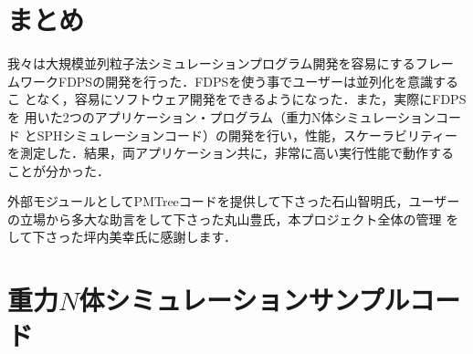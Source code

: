 \documentclass[submit,techreq,noauthor]{ipsj}
\begin{document}
\section{まとめ}

我々は大規模並列粒子法シミュレーションプログラム開発を容易にするフレー
ムワークFDPSの開発を行った．FDPSを使う事でユーザーは並列化を意識するこ
となく，容易にソフトウェア開発をできるようになった．また，実際にFDPSを
用いた2つのアプリケーション・プログラム（重力N体シミュレーションコード
  とSPHシミュレーションコード）の開発を行い，性能，スケーラビリティー
を測定した．結果，両アプリケーション共に，非常に高い実行性能で動作する
ことが分かった．


\begin{acknowledgment}
  外部モジュールとしてPMTreeコードを提供して下さった石山智明氏，ユーザー
  の立場から多大な助言をして下さった丸山豊氏，本プロジェクト全体の管理
  をして下さった坪内美幸氏に感謝します．
\end{acknowledgment}




\appendix

\section{重力$N$体シミュレーションサンプルコード}
\end{document}
